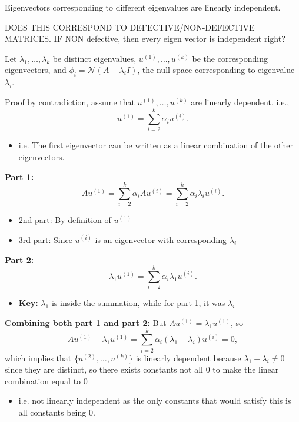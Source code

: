 \begin{theorem}
    Eigenvectors corresponding to different eigenvalues are linearly independent.
\end{theorem}

\begin{warning}
    DOES THIS CORRESPOND TO DEFECTIVE/NON-DEFECTIVE MATRICES. IF NON defective, then every eigen vector is independent right?
\end{warning}

\begin{derivation}
    Let $\lambda_1, \ldots, \lambda_k$ be distinct eigenvalues, $u^{(1)}, \ldots, u^{(k)}$ be the corresponding eigenvectors, and $\phi_i = \mathcal{N}(A - \lambda_i I)$, the null space corresponding to eigenvalue $\lambda_i$.
    \vspace{1em}

    Proof by contradiction, assume that $u^{(1)}, \ldots, u^{(k)}$ are linearly dependent, i.e.,
    \[
    u^{(1)} = \sum_{i=2}^{k} \alpha_i u^{(i)}.
    \]
    \begin{itemize}
        \item i.e. The first eigenvector can be written as a linear combination of the other eigenvectors. 
    \end{itemize}
    \vspace{1em}

    \textbf{Part 1:}
    \[
    A u^{(1)} = \sum_{i=2}^{k} \alpha_i A u^{(i)} = \sum_{i=2}^{k} \alpha_i \lambda_i u^{(i)}.
    \]
    \begin{itemize}
        \item 2nd part: By definition of $u^{(1)}$
        \item 3rd part: Since $u^{(i)}$ is an eigenvector with corresponding $\lambda_i$
    \end{itemize}

    \textbf{Part 2:}
    \[
    \lambda_1 u^{(1)} = \sum_{i=2}^{k} \alpha_i \lambda_1 u^{(i)}.
    \]
    \begin{itemize}
        \item \textbf{Key:} $\lambda_1$ is inside the summation, while for part 1, it was $\lambda_i$
    \end{itemize}
    \vspace{1em}

    \textbf{Combining both part 1 and part 2:}
    But $A u^{(1)} = \lambda_1 u^{(1)}$, so
    \[
    A u^{(1)} - \lambda_1 u^{(1)} =\sum_{i=2}^{k} \alpha_i (\lambda_1 - \lambda_i) u^{(i)} = 0,
    \]
    which implies that $\{u^{(2)}, \ldots, u^{(k)}\}$ is linearly dependent because $\lambda_1 - \lambda_i \neq 0$ since they are distinct, so there exists constants not all 0 to make the linear combination equal to 0 
    \begin{itemize}
        \item i.e. not linearly independent as the only constants that would satisfy this is all constants being $0$.
    \end{itemize}
    \vspace{1em}


\end{derivation}
